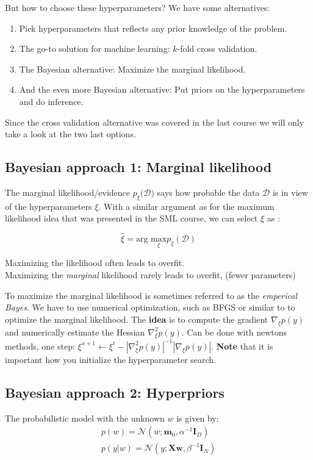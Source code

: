 But how to choose these hyperparameters? We have some alternatives:

\begin{enumerate}
	\item Pick hyperparameters that reflects any prior knowledge of the problem.
	\item The go-to solution for machine learning: $k$-fold cross validation.
	\item The Bayesian alternative: Maximize the marginal likelihood.
	\item And the even more Bayesian alternative: Put priors on the hyperparameters and do inference. 
\end{enumerate}

Since the cross validation alternative was covered in the last course we will only take a look at the two last options.

\subsection{Bayesian approach 1: Marginal likelihood}
The marginal likelihood/evidence $p_\xi (\mathcal{D)}$ says how probable the data $\mathcal{D}$ is in view of the hyperparameters $\xi $. With a similar argument as for the maximum likelihood idea that was presented in the SML course, we can select $\xi $  as :

\begin{equation}
	\hat{\xi } = \text{arg } \underset{\xi }{\text{max}} p_\xi (\mathcal{D})   
\end{equation}

\begin{wbox}{}
Maximizing the likelihood often leads to overfit. \\
Maximizing the \emph{marginal} likelihood rarely leads to overfit, (fewer parameters)
\end{wbox}

To maximize the marginal likelihood is sometimes referred to as the \emph{emperical Bayes}. We have to use numerical optimization, such as BFGS or similar to to optimize the marginal likelihood. The \textbf{idea} is to compute the gradient $\nabla_\xi p(y)$ and numerically estimate the Hessian $\nabla ^{2}_\xi p(y)$. Can be done with newtons methods, one step: $\xi ^{x+1} \leftarrow \xi ^{t}- |\nabla ^{2}_\xi p(y)|^{-1}	|\nabla_\xi p(y)|$. \textbf{Note} that it is important how you initialize the hyperparameter search. 

\subsection{Bayesian approach 2: Hyperpriors}
The probabilistic model with the unknown $w$ is given by:
\begin{equation}
\begin{aligned}
p(w) = \mathcal{N}(w;\bm{m}_0, \alpha ^{-1}\bm{I}_D)\\
	p(y|w) = \mathcal{N}(y; \bm{Xw}, \beta ^{-1} \bm{I}_N)
\end{aligned}
\end{equation}

